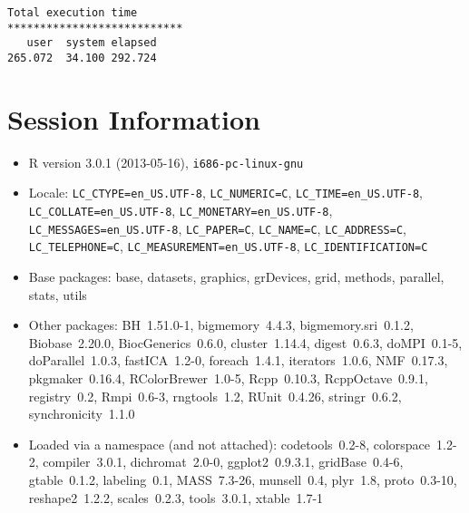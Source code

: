 \documentclass[10pt]{article}\usepackage[]{graphicx}\usepackage[]{color}
\begin{document}
\begin{verbatim}
Total execution time
***************************
   user  system elapsed 
265.072  34.100 292.724 

\end{verbatim}

\section*{Session Information}
\begin{itemize}\raggedright
  \item R version 3.0.1 (2013-05-16), \verb|i686-pc-linux-gnu|
  \item Locale: \verb|LC_CTYPE=en_US.UTF-8|, \verb|LC_NUMERIC=C|, \verb|LC_TIME=en_US.UTF-8|, \verb|LC_COLLATE=en_US.UTF-8|, \verb|LC_MONETARY=en_US.UTF-8|, \verb|LC_MESSAGES=en_US.UTF-8|, \verb|LC_PAPER=C|, \verb|LC_NAME=C|, \verb|LC_ADDRESS=C|, \verb|LC_TELEPHONE=C|, \verb|LC_MEASUREMENT=en_US.UTF-8|, \verb|LC_IDENTIFICATION=C|
  \item Base packages: base, datasets, graphics, grDevices, grid,
    methods, parallel, stats, utils
  \item Other packages: BH~1.51.0-1, bigmemory~4.4.3,
    bigmemory.sri~0.1.2, Biobase~2.20.0, BiocGenerics~0.6.0,
    cluster~1.14.4, digest~0.6.3, doMPI~0.1-5, doParallel~1.0.3,
    fastICA~1.2-0, foreach~1.4.1, iterators~1.0.6, NMF~0.17.3,
    pkgmaker~0.16.4, RColorBrewer~1.0-5, Rcpp~0.10.3, RcppOctave~0.9.1,
    registry~0.2, Rmpi~0.6-3, rngtools~1.2, RUnit~0.4.26,
    stringr~0.6.2, synchronicity~1.1.0
  \item Loaded via a namespace (and not attached): codetools~0.2-8,
    colorspace~1.2-2, compiler~3.0.1, dichromat~2.0-0, ggplot2~0.9.3.1,
    gridBase~0.4-6, gtable~0.1.2, labeling~0.1, MASS~7.3-26,
    munsell~0.4, plyr~1.8, proto~0.3-10, reshape2~1.2.2, scales~0.2.3,
    tools~3.0.1, xtable~1.7-1
\end{itemize}
\end{document}
